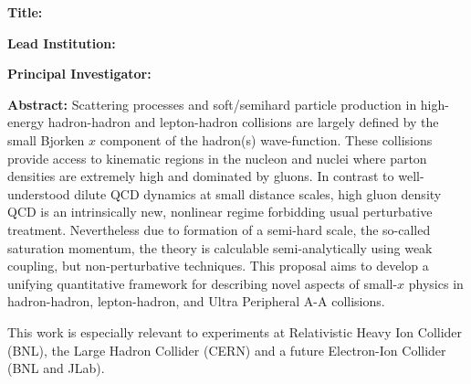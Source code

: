 %
\vspace{0.5em}
\noindent
{\bf Title:} \Title

\vspace{0.5em}
\noindent
{\bf Lead Institution:} \Institute

\vspace{0.5em}
\noindent
{\bf Principal Investigator:} \Investigator


\vspace{0.5em}
\noindent


\vspace{0.5em}
\noindent
{\bf Abstract:} 
Scattering processes and soft/semihard particle production in high-energy
hadron-hadron and lepton-hadron collisions are largely defined  by the 
small Bjorken $x$ component of the hadron(s) wave-function. 
These  collisions provide access to kinematic regions 
in the nucleon and nuclei where parton densities are extremely high 
and dominated by gluons. In contrast to 
well-understood dilute QCD dynamics at small distance scales, 
high gluon density QCD is an intrinsically new, nonlinear regime
forbidding usual perturbative treatment. Nevertheless due to formation of a semi-hard scale, 
the so-called saturation momentum, the theory is calculable  semi-analytically using 
weak coupling, but non-perturbative techniques.
This proposal aims to develop  a unifying quantitative framework for 
describing  novel aspects of small-$x$ physics in hadron-hadron,
lepton-hadron, and Ultra Peripheral A-A collisions.

This work is especially relevant to experiments at  Relativistic Heavy Ion Collider (BNL),
the Large Hadron Collider (CERN) and a future Electron-Ion Collider (BNL and JLab).  




